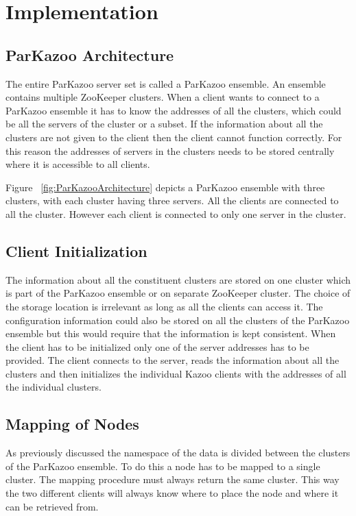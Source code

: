 \chapter{Implementation}

\section{ParKazoo Architecture}
The entire ParKazoo server set is called a ParKazoo ensemble. An ensemble contains multiple ZooKeeper clusters. When a client wants to connect to a ParKazoo ensemble it has to know the addresses of all the clusters, which could be all the servers of the cluster or a subset. If the information about all the clusters are not given to the client then the client cannot function correctly. For this reason the addresses of servers in the clusters needs to be stored centrally where it is accessible to all clients.  

\addvspace{1em}

\addvspace{1em}
Figure ~\ref{fig:ParKazooArchitecture} depicts a ParKazoo ensemble with three clusters, with each cluster having three servers. All the clients are connected to all the cluster. However each client is connected to only one server in the cluster.
  	
\section{Client Initialization}
The information about all the constituent clusters are stored on one cluster which is part of the ParKazoo ensemble or on separate ZooKeeper cluster. The choice of the storage location is irrelevant as long as all the clients can access it. The configuration information could also be stored on all the clusters of the ParKazoo ensemble but this would require that the information is kept consistent. When the client has to be initialized only one of the server addresses has to be provided. The client connects to the server, reads the information about all the clusters and then initializes the individual Kazoo clients with the addresses of all the individual clusters.

\section{Mapping of Nodes}
As previously discussed the namespace of the data is divided between the clusters of the ParKazoo ensemble. To do this a node has to be mapped to a single cluster. The mapping procedure must always return the same cluster. This way the two different clients will always know where to place the node and where it can be retrieved from.

